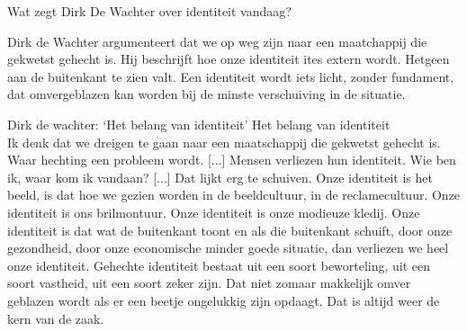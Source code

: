 \documentclass[main.tex]{subfiles}
\begin{document}
\begin{examenvraag}
    \begin{vraag}
        Wat zegt Dirk De Wachter over identiteit vandaag?
    \end{vraag}

    \begin{antwoord}
        Dirk de Wachter argumenteert dat we op weg zijn naar een maatchappij die gekwetst gehecht is.
        Hij beschrijft hoe onze identiteit ites extern wordt. Hetgeen aan de buitenkant te zien valt.
        Een identiteit wordt iets licht, zonder fundament, dat omvergeblazen kan worden bij de minste verschuiving in de situatie.
        \begin{citaat}{Dirk de wachter: `Het belang van identiteit'}
            Het belang van identiteit\\
            Ik denk dat we dreigen te gaan naar een maatschappij die gekwetst gehecht is.
            Waar hechting een probleem wordt.
            [...]
            Mensen verliezen hun identiteit.
            Wie ben ik, waar kom ik vandaan?
            [...]
            Dat lijkt erg te schuiven.
            Onze identiteit is het beeld, is dat hoe we gezien worden in de beeldcultuur, in de reclamecultuur.
            Onze identiteit is ons brilmontuur.
            Onze identiteit is onze modieuze kledij.
            Onze identiteit is dat wat de buitenkant toont en als die buitenkant schuift, door onze gezondheid, door onze economische minder goede situatie, dan verliezen we heel onze identiteit.
            Gehechte identiteit bestaat uit een soort beworteling, uit een soort vastheid, uit een soort zeker zijn.
            Dat niet zomaar makkelijk omver geblazen wordt als er een beetje ongelukkig zijn opdaagt.
            Dat is altijd weer de kern van de zaak.
        \end{citaat}
    \end{antwoord}
\end{examenvraag}
\end{document}
